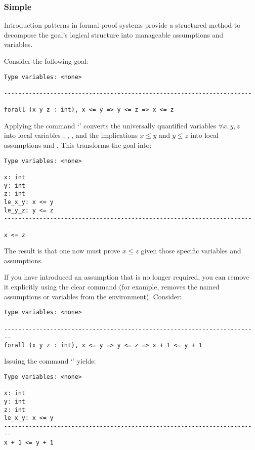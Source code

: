 \subsubsection{Simple}
Introduction patterns in formal proof systems provide a structured method to decompose the goal's logical structure into manageable assumptions and variables.
\begin{example}
Consider the following goal:
\begin{lstlisting}[style=normal]
Type variables: <none>

------------------------------------------------------------------------
forall (x y z : int), x <= y => y <= z => x <= z
\end{lstlisting}
Applying the command `' converts the universally quantified variables $\forall x,y,z$ into local variables , , , and the implications $x\leq y$ and 
$y\leq z$ into local assumptions  and . This transforms the goal into:
\begin{lstlisting}[style=normal]
Type variables: <none>

x: int
y: int
z: int
le_x_y: x <= y
le_y_z: y <= z
------------------------------------------------------------------------
x <= z
\end{lstlisting}
The result is that one now must prove $x\leq z$ given those specific variables and assumptions.
\end{example}
\begin{example}
If you have introduced an assumption that is no longer required, you can remove it explicitly using the clear command (for example,  removes the named assumptions or variables from the environment).
Consider:
\begin{lstlisting}[style=normal]
Type variables: <none>

------------------------------------------------------------------------
forall (x y z : int), x <= y => y <= z => x + 1 <= y + 1
\end{lstlisting}
Issuing the command `' yields:
\begin{lstlisting}[style=normal]
Type variables: <none>

x: int
y: int
z: int
le_x_y: x <= y
------------------------------------------------------------------------
x + 1 <= y + 1
\end{lstlisting}
\end{example}

